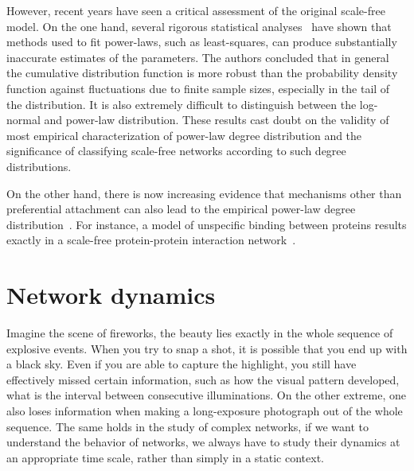 However, recent years have seen a critical assessment of the original 
scale-free model. On the one hand, several rigorous statistical analyses~%
\citep{Clauset2009,Khanin2006a} have shown that methods used to fit power-laws, such as 
least-squares, can produce substantially inaccurate estimates of the 
parameters. The authors concluded that in general the cumulative distribution
function is more robust than the probability density function against 
fluctuations due to finite sample sizes, especially in the tail of the 
distribution. It is also extremely difficult to distinguish between
the log-normal and power-law distribution. These results cast doubt on the
validity of most empirical characterization of power-law degree distribution
and the significance of classifying scale-free networks according to such
degree distributions.

On the other hand, there is now increasing evidence that mechanisms other than
preferential attachment can also lead to the empirical power-law degree 
distribution~\citep{Caldarelli2002}. For instance, a model of unspecific 
binding between proteins results exactly in a scale-free protein-protein 
interaction network~\citep{Deeds2006}.

\section{Network dynamics}
Imagine the scene of fireworks, the beauty lies exactly in the whole sequence 
of explosive events. When you try to snap a shot, it is possible that you end up with
a black sky. Even if you are able to capture the highlight, 
you still have  
effectively missed certain information, such as how the 
visual pattern developed,
what is the interval between consecutive illuminations. 
On the other extreme, one also loses information when making
a long-exposure photograph out of the whole sequence.
The same holds in the
study of complex networks, if we want to understand the behavior of networks,
we always have to study their dynamics at an appropriate time scale, 
rather than simply in a static context.

